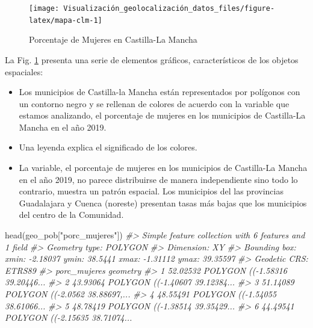 \documentclass[
]{report}
\newenvironment{Shaded}{\begin{snugshade}}{\end{snugshade}}
\newcommand{\CommentTok}[1]{\textcolor[rgb]{0.56,0.35,0.01}{\textit{#1}}}
\newcommand{\FunctionTok}[1]{\textcolor[rgb]{0.00,0.00,0.00}{#1}}
\newcommand{\NormalTok}[1]{#1}
\newcommand{\StringTok}[1]{\textcolor[rgb]{0.31,0.60,0.02}{#1}}
\theoremstyle{definition}
\theoremstyle{definition}
\theoremstyle{definition}
\theoremstyle{definition}
\theoremstyle{remark}
\begin{document}
\begin{figure}

{\centering \texttt{[image: Visualización\_geolocalización\_datos\_files/figure-latex/mapa-clm-1]} 

}

\caption{Porcentaje de Mujeres en Castilla-La Mancha}\label{fig:mapa-clm}
\end{figure}

La Fig. \ref{fig:mapa-clm} presenta una serie de elementos gráficos,
característicos de los objetos espaciales:

\begin{itemize}
\item
  Los municipios de Castilla-la Mancha están representados por polígonos con
  un contorno negro y se rellenan de colores de acuerdo con la variable que
  estamos analizando, el porcentaje de mujeres en los municipios de
  Castilla-La Mancha en el año 2019.
\item
  Una leyenda explica el significado de los colores.
\item
  La variable, el porcentaje de mujeres en los municipios de Castilla-La
  Mancha en el año 2019, no parece distribuirse de manera independiente sino
  todo lo contrario, muestra un patrón espacial. Los municipios del las
  provincias Guadalajara y Cuenca (noreste) presentan tasas más bajas que los
  municipios del centro de la Comunidad.
\end{itemize}

\begin{Shaded}
\begin{Highlighting}[]
\FunctionTok{head}\NormalTok{(geo\_pob[}\StringTok{"porc\_mujeres"}\NormalTok{])}
\CommentTok{\#\textgreater{} Simple feature collection with 6 features and 1 field}
\CommentTok{\#\textgreater{} Geometry type: POLYGON}
\CommentTok{\#\textgreater{} Dimension:     XY}
\CommentTok{\#\textgreater{} Bounding box:  xmin: {-}2.18037 ymin: 38.5441 xmax: {-}1.31112 ymax: 39.35597}
\CommentTok{\#\textgreater{} Geodetic CRS:  ETRS89}
\CommentTok{\#\textgreater{}   porc\_mujeres                       geometry}
\CommentTok{\#\textgreater{} 1     52.02532 POLYGON (({-}1.58316 39.20446...}
\CommentTok{\#\textgreater{} 2     43.93064 POLYGON (({-}1.40607 39.12384...}
\CommentTok{\#\textgreater{} 3     51.14089 POLYGON (({-}2.0562 38.88697,...}
\CommentTok{\#\textgreater{} 4     48.55491 POLYGON (({-}1.54055 38.61066...}
\CommentTok{\#\textgreater{} 5     48.78419 POLYGON (({-}1.38514 39.35429...}
\CommentTok{\#\textgreater{} 6     44.49541 POLYGON (({-}2.15635 38.71074...}
\end{Highlighting}
\end{Shaded}
\end{document}
